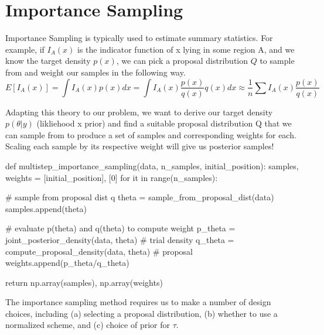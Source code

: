 \documentclass[12pt,letterpaper,twoside]{article}
\begin{document}
\section{Importance Sampling}

Importance Sampling is typically used to estimate summary statistics. 
For example, if $I_A(x)$ is the indicator function of x lying in 
some region A, and we know the target density $p(x)$, we can pick a 
proposal distribution $Q$ to sample from and weight our samples 
in the following way.
$$ E[I_A(x)] = \int I_A(x) p(x) dx = \int I_A(x) \frac{p(x)}{q(x)} q(x) dx \approx \frac{1}{n} \sum I_A(x) \frac{p(x)}{q(x)} $$ 

Adapting this theory to our problem, we want to derive our target 
density $p(\theta|y)$ (likliehood x prior) and find a suitable 
proposal distribution Q that we can sample from to produce a set 
of samples and corresponding weights for each. Scaling each sample 
by its respective weight will give us posterior samples! \newline

\begin{python}
    def multistep_importance_sampling(data, n_samples, initial_position):
    samples, weights = [initial_position], [0]
    for it in range(n_samples):

        # sample from proposal dist q
        theta = sample_from_proposal_dist(data)
        samples.append(theta)

        # evaluate p(theta) and q(theta) to compute weight
        p_theta = joint_posterior_density(data, theta)  # trial density
        q_theta = compute_proposal_density(data, theta)  # proposal
        weights.append(p_theta/q_theta)

    return np.array(samples), np.array(weights)
\end{python}

The importance sampling method requires us to make a number of design 
choices, including (a) selecting a proposal distribution, (b) whether to 
use a normalized scheme, and (c) choice of prior for $\tau$.
\end{document}
